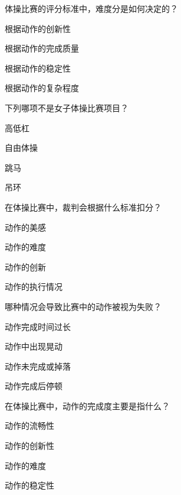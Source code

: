 \documentclass{exam-zh}
\begin{document}
    \begin{question}[points = 2]
    体操比赛的评分标准中，难度分是如何决定的？
    \begin{choices}
    \item 根据动作的创新性
    \item 根据动作的完成质量
    \item 根据动作的稳定性
    \item 根据动作的复杂程度
    \end{choices}
    \end{question}
    
    \begin{question}[points = 2]
    下列哪项不是女子体操比赛项目？
    \begin{choices}
    \item 高低杠
    \item 自由体操
    \item 跳马
    \item 吊环
    \end{choices}
    \end{question}
    
    \begin{question}[points = 2]
    在体操比赛中，裁判会根据什么标准扣分？
    \begin{choices}
    \item 动作的美感
    \item 动作的难度
    \item 动作的创新
    \item 动作的执行情况
    \end{choices}
    \end{question}
    
    \begin{question}[points = 2]
    哪种情况会导致比赛中的动作被视为失败？
    \begin{choices}
    \item 动作完成时间过长
    \item 动作中出现晃动
    \item 动作未完成或掉落
    \item 动作完成后停顿
    \end{choices}
    \end{question}
    
    \begin{question}[points = 2]
    在体操比赛中，动作的完成度主要是指什么？
    \begin{choices}
    \item 动作的流畅性
    \item 动作的创新性
    \item 动作的难度
    \item 动作的稳定性
    \end{choices}
    \end{question}
    
\end{document}
